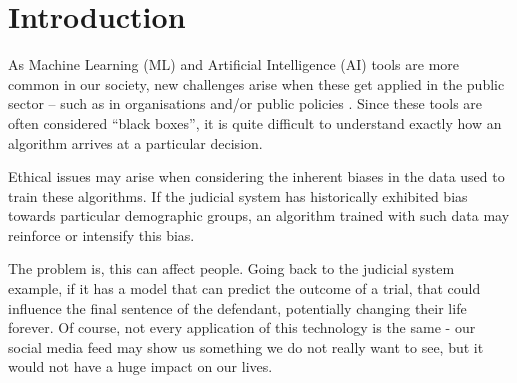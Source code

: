 \documentclass[twoside,11pt]{article}
\begin{document}
\begin{abstract}
In the times when AI and ML applications are more widely spread across our society, new challenges arise when these are being used by public organisations. Ethical concerns may emerge for various reasons, but specially when these models inherit certain biases that could eventually lead up to hurting and/or punishing people with no reason whatsoever. In this study, a comprehensive methodology is introduced to address ethical considerations in machine learning, particularly focusing on biases and disparities. This paper showcases the application of this methodology through two experiments, each involving two models: a base model without ethical considerations and an improved one. The primary objective was to evaluate and mitigate inequalities and biases in machine learning models, in this case, using data from Chile's Public Criminal Defence Office (DPP), which needed a tool that could help in predicting the outcome of a criminal trial. The results were promising, with improvements observed in both models. Specifically, for one of our experiments, there was a reduction in the false negative rate from 40.54\% to 31.63\%. Additionally, disparities between attributes were reduced by an average of 44.37\%. The methodology not only aids in understanding these ethical challenges but also offers tools to optimize and address them, all while maintaining performance.
\end{abstract}

\section{Introduction}
\label{Introduction}

 As Machine Learning (ML) and Artificial Intelligence (AI) tools are more common in our society, new challenges arise when these get applied in the public sector -- such as in organisations and/or public policies . Since these tools are often considered ``black boxes'', it is quite difficult to understand exactly how an algorithm arrives at a particular decision. 

Ethical issues may arise when considering the inherent biases in the data used to train these algorithms. If the judicial system has historically exhibited bias towards particular demographic groups, an algorithm trained with such data may reinforce or intensify this bias.

The problem is, this can affect people. Going back to the judicial system example, if it has a model that can predict the outcome of a trial, that could influence the final sentence of the defendant, potentially changing their life forever. Of course, not every application of this technology is the same - our social media feed may show us something we do not really want to see, but it would not have a huge impact on our lives. 
\end{document}
